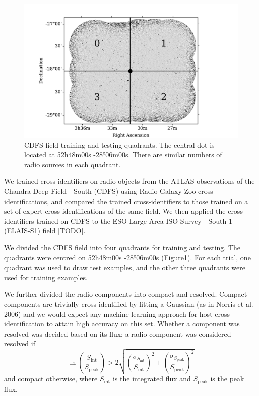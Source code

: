\documentclass[fleqn,usenatbib,usedcolumn]{mnras}
\newcommand{\text}{\mathrm}
\begin{document}
    \begin{figure}
    \centering
    \includegraphics{images/quadrants.pdf}
    \caption{CDFS field training and testing quadrants. The central dot is
    located at 52h48m00s -28°06m00s. There are similar numbers of radio
    sources in each quadrant.\label{fig:quadrants}}
    \end{figure}

    We trained cross-identifiers on radio objects from the ATLAS
    observations of the Chandra Deep Field - South (CDFS) using Radio Galaxy
    Zoo cross-identifications, and compared the trained cross-identifiers to
    those trained on a set of expert cross-identifications of the same
    field. We then applied the cross-identifiers trained on CDFS to the ESO
    Large Area ISO Survey - South 1 (ELAIS-S1) field {[}TODO{]}.

    We divided the CDFS field into four quadrants for training and testing.
    The quadrants were centred on 52h48m00s -28°06m00s
    ({Figure}\ref{fig:quadrants}). For each trial, one quadrant
    was used to draw test examples, and the other three quadrants were used
    for training examples.

    We further divided the radio components into compact and resolved.
    Compact components are trivially cross-identified by fitting a Gaussian
    (as in Norris et al. 2006) and we would expect any machine learning
    approach for host cross-identification to attain high accuracy on this
    set. Whether a component was resolved was decided based on its flux; a
    radio component was considered resolved if \[
        \ln \left(\frac{S_{\text{int}}}{S_{\text{peak}}}\right) > 2\sqrt{\left(\frac{\sigma_{S_{\text{int}}}}{S_{\text{int}}}\right)^2 + \left(\frac{\sigma_{S_{\text{peak}}}}{S_{\text{peak}}}\right)^2}
    \] and compact otherwise, where \(S_{\text{int}}\) is the integrated
    flux and \(S_{\text{peak}}\) is the peak flux.
\end{document}
